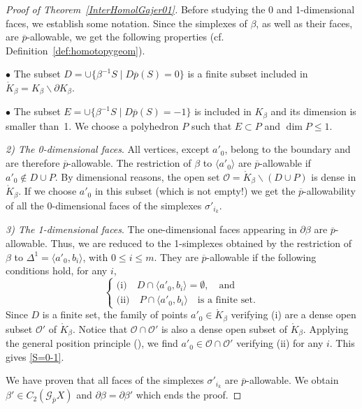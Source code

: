 \documentclass[a4paper,10pt,english,reqno]{amsart}
\theoremstyle{plain}
\theoremstyle{definition}
\theoremstyle{remark}
\numberwithin{equation}{section}
\newcommand{\thmref}[1]{Theorem~\ref{#1}}
\newcommand{\defref}[1]{Definition~\ref{#1}}
\def\ov{\overline}
\def\cO{{\mathcal O}}
\def\crG{{\mathscr G}}
\def\menos{\backslash}
\newcommand{\inte}[1]{\mathring{#1}}
\renewcommand\1{\hbox{\ding{192}}}
\renewcommand\2{\hbox{\ding{193}}}
\newcommand\3{\hbox{\ding{194}}}
\newcommand\4{\hbox{\ding{195}}}
\begin{document}
\begin{proof}[Proof of \thmref{InterHomolGajer01}]
\smallskip
Before studying the 0 and 1-dimensional faces, we establish some notation. Since the simplexes of $\beta$,
as well as their faces, are $\ov{p}$-allowable, we get the following properties (cf. \defref{def:homotopygeom}).

$\bullet$ The subset $D=\cup\{\beta^{-1}S\mid D\ov{p}(S)=0\}$
is a finite subset included in $\inte K_{\beta}=K_{\beta}\menos \partial K_{\beta}$.

$\bullet$ The subset $E=\cup\{\beta^{-1}S\mid D\ov{p}(S)=-1\}$
is included in $K_{\beta}$ and its dimension is smaller than~1. We choose a polyhedron $P$
such that $E\subset P$ and $\dim P\leq 1$.

\smallskip 
\emph{2) The 0-dimensional faces}.  
All vertices, except $a'_{0}$, belong to the boundary and are therefore $\ov{p}$-allowable.
The restriction of $\beta$ to $\langle a'_{0}\rangle$ are 
 $\ov p$-allowable if $a'_{0}\notin D\cup P$. By dimensional reasons, the open set
 $\cO
=\inte K_{\beta}\menos (D\cup P)$ is dense in $\inte K_{\beta}$. If we choose $a'_{0}$
in this subset (which is not empty!) we get the $\ov{p}$-allowability of all the 0-dimensional faces 
of the simplexes $\sigma'_{i_{k}}$.
% 

\smallskip
 \emph{3) The 1-dimensional faces}.  
 The one-dimensional faces   appearing in $\partial \beta$ are $\ov p$-allowable. Thus, we are reduced to the 1-simplexes obtained by the restriction of $\beta$ to
 $\Delta^1= \langle a'_0,b_i\rangle$, with $0\leq i\leq m$.
 They are  $\ov p$-allowable if the following conditions hold, for any $i$,
 \begin{equation}\label{S=0-1}
 \left\{
 \begin{array}{l}
 \text{(i)}\quad D\cap \langle a'_{0},b_{i}\rangle=\emptyset, \quad\text{and}\\
\text{(ii)}\quad P\cap \langle a'_{0},b_{i}\rangle \quad\text{is a finite set.}
 \end{array}
 \right.
 \end{equation}
 Since $D$ is a finite set, the family of points $a'_{0}\in \inte K_{\beta}$ verifying (i) are a dense open subset
 $\cO'$ of $\inte K_{\beta}$. Notice that $\cO\cap \cO'$ is also a dense open subset of $\inte K_{\beta}$.
 Applying the general position principle (\cite[Section 5.34]{MR0350744}), 
 we find $a'_{0}\in \cO\cap \cO'$ verifying (ii) for any $i$.
 This gives \eqref{S=0-1}.


\smallskip
 We have proven that all  faces of the simplexes $\sigma'_{i_k}$ are $\ov p$-allowable. We obtain
$\beta' \in C_2(\crG_{\ov p}X)$ and $\partial \beta = \partial \beta'$ which ends the proof.
%
\end{proof}
%
\end{document}
